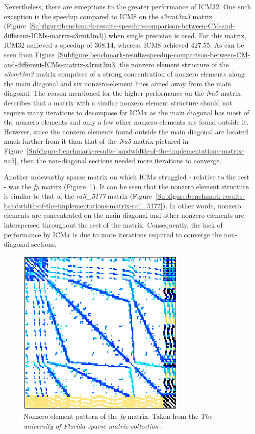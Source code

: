 Nevertheless, there are exceptions to the greater performance of ICM32. One such exception is the speedup compared to ICM8 on the \textit{s3rmt3m3} matrix (Figure~\ref{Subfigure:benchmark-results-speedup-comparison-between-CM-and-different-ICMs-matrix-s3rmt3m3}) when single precision is used. For this matrix, ICM32 achieved a speedup of $ 368.14 $, whereas ICM8 achieved $ 427.55 $. As can be seen from Figure~\ref{Subfigure:benchmark-results-speedup-comparison-between-CM-and-different-ICMs-matrix-s3rmt3m3} the nonzero element structure of the \textit{s3rmt3m3} matrix comprises of a strong concentration of nonzero elements along the main diagonal and six nonzero-element lines aimed away from the main diagonal. The reason mentioned for the higher performance on the \textit{Na5} matrix describes that a matrix with a similar nonzero element structure should not require many iterations to decompose for ICM$ x $ as the main diagonal has most of the nonzero elements and only a few other nonzero elements are found outside it. However, since the nonzero elements found outside the main diagonal are located much further from it than that of the \textit{Na5} matrix pictured in Figure~\ref{Subfigure:benchmark-results-bandwidth-of-the-implementations-matrix-na5}, then the non-diagonal sections needed more iterations to converge.
\par Another noteworthy sparse matrix on which ICM$ x $ struggled - relative to the rest - was the \textit{fp} matrix (Figure~\ref{Figure:benchmark-results-speedup-comparison-between-CM-and-different-ICMs-matrix-fp}). It can be seen that the nonzero element structure is similar to that of the \textit{rail\_5177} matrix (Figure~\ref{Subfigure:benchmark-results-bandwidth-of-the-implementations-matrix-rail_5177}). In other words, nonzero elements are concentrated on the main diagonal and other nonzero elements are interspersed throughout the rest of the matrix. Consequently, the lack of performance by ICM$ x $ is due to more iterations required to converge the non-diagonal sections.

\begin{figure}[h!]
	\centering
	\includegraphics[width=.35\textwidth, keepaspectratio, clip]{images/ch3/matrices/fp.png}
	\caption{Nonzero element pattern of the \mbox{\textit{fp}} matrix. Taken from the \emph{The university of Florida sparse matrix collection} \cite{Davis2011}.}
	\label{Figure:benchmark-results-speedup-comparison-between-CM-and-different-ICMs-matrix-fp}
\end{figure}

